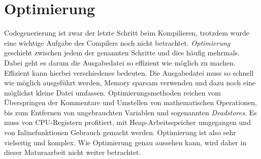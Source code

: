 \section{Optimierung}
Codegenerierung ist zwar der letzte Schritt beim Kompilieren, trotzdem wurde eine wichtige Aufgabe des Compilers noch nicht betrachtet. \textit{Optimierung} geschieht zwischen jedem der genannten Schritte und dies häufig mehrmals.
Dabei geht es darum die Ausgabedatei so effizient wie möglich zu machen. Effizient kann hierbei verschiedenes bedeuten.
Die Ausgabedatei muss so schnell wie möglich ausgeführt werden, Memory sparsam verwenden und dazu noch eine möglichst kleine Datei umfassen. 
Optimierungsmethoden reichen vom Überspringen der Kommentare und Umstellen von mathematischen Operationen, bis zum Entfernen von ungebrauchten Variablen und sogenannten \textit{Deadstores}.
Es muss von CPU-Registern profitiert, mit Heap-Arbeitsspeicher umgegangen und von Inlinefunktionen Gebrauch gemacht werden. %
Optimierung ist also sehr vielseitig und komplex.
Wie Optimierung genau aussehen kann, wird daher in dieser Maturaarbeit nicht weiter betrachtet.
